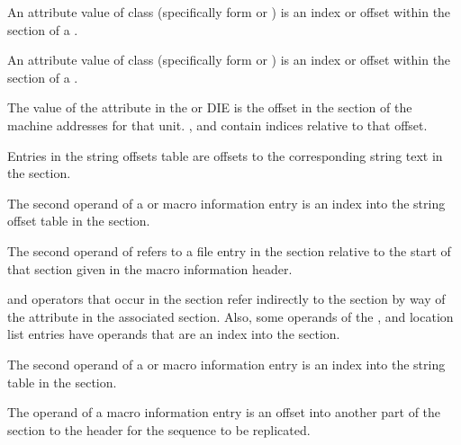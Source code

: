 \begin{description}
An attribute value of class \CLASSrnglist{} 
(specifically form \DWFORMrnglistx{} or \DWFORMsecoffset) 
is an index or offset within the \dotdebugrnglists{} 
section of a .

An attribute value of class \CLASSloclist{} 
(specifically form \DWFORMloclistx{} or \DWFORMsecoffset) 
is an index or offset within the \dotdebugloclists{}
section of a .

The value of the \DWATaddrbase{} attribute in the
\DWTAGcompileunit{} or \DWTAGpartialunit{} DIE is the
offset in the \dotdebugaddr{} section of the machine
addresses for that unit.
\DWFORMaddrxXN, \DWOPaddrx{} and \DWOPconstx{} contain
indices relative to that offset.

Entries in the string offsets table
are offsets to the corresponding string text in the 
\dotdebugstr{} section.

The second operand of a 
\DWMACROdefinestrx{} or \DWMACROundefstrx{} 
macro information entry is an index
into the string offset table in the 
\dotdebugstroffsets{} section.

The second operand of 
\DWMACROstartfile{} refers to a file entry in the 
\dotdebugline{} section relative to the start 
of that section given in the macro information header.

\DWOPaddrx{} and \DWOPconstx{} operators that occur in the 
\dotdebugloclists{} section refer indirectly to the 
\dotdebugaddr{} section by way of the 
\DWATaddrbase{} attribute in the associated \dotdebuginfo{} 
section.
\bb
Also, some operands of the \DWLLEbaseaddressx, \DWLLEstartxendx{} 
and \DWLLEstartxlength{} location list entries have operands that 
are an index into the \dotdebugaddr{} section.
\eb

The second operand of a 
\DWMACROdefinestrp{} or \DWMACROundefstrp{} macro information
entry is an index into the string table in the 
\dotdebugstr{} section.

The operand of a 
\DWMACROimport{} macro information
entry is an offset into another part of the 
\dotdebugmacro{} section to the header for the 
sequence to be replicated.


\end{description}
